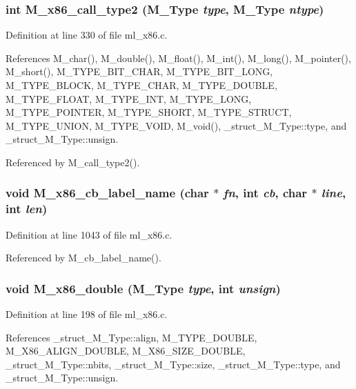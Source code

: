 \subsubsection{\setlength{\rightskip}{0pt plus 5cm}int M\_\-x86\_\-call\_\-type2 (\bf{M\_\-Type} {\em type}, \bf{M\_\-Type} {\em ntype})}\label{ml__x86_8c_a2b8eeed98c4e10d36db0cf9955b7a13}




Definition at line 330 of file ml\_\-x86.c.

References M\_\-char(), M\_\-double(), M\_\-float(), M\_\-int(), M\_\-long(), M\_\-pointer(), M\_\-short(), M\_\-TYPE\_\-BIT\_\-CHAR, M\_\-TYPE\_\-BIT\_\-LONG, M\_\-TYPE\_\-BLOCK, M\_\-TYPE\_\-CHAR, M\_\-TYPE\_\-DOUBLE, M\_\-TYPE\_\-FLOAT, M\_\-TYPE\_\-INT, M\_\-TYPE\_\-LONG, M\_\-TYPE\_\-POINTER, M\_\-TYPE\_\-SHORT, M\_\-TYPE\_\-STRUCT, M\_\-TYPE\_\-UNION, M\_\-TYPE\_\-VOID, M\_\-void(), \_\-struct\_\-M\_\-Type::type, and \_\-struct\_\-M\_\-Type::unsign.

Referenced by M\_\-call\_\-type2().
\subsubsection{\setlength{\rightskip}{0pt plus 5cm}void M\_\-x86\_\-cb\_\-label\_\-name (char $\ast$ {\em fn}, int {\em cb}, char $\ast$ {\em line}, int {\em len})}\label{ml__x86_8c_c47605e04d84eb266b6b962b0e12ad75}




Definition at line 1043 of file ml\_\-x86.c.

Referenced by M\_\-cb\_\-label\_\-name().
\subsubsection{\setlength{\rightskip}{0pt plus 5cm}void M\_\-x86\_\-double (\bf{M\_\-Type} {\em type}, int {\em unsign})}\label{ml__x86_8c_44f6300a10cafc1f87c680770660ea27}




Definition at line 198 of file ml\_\-x86.c.

References \_\-struct\_\-M\_\-Type::align, M\_\-TYPE\_\-DOUBLE, M\_\-X86\_\-ALIGN\_\-DOUBLE, M\_\-X86\_\-SIZE\_\-DOUBLE, \_\-struct\_\-M\_\-Type::nbits, \_\-struct\_\-M\_\-Type::size, \_\-struct\_\-M\_\-Type::type, and \_\-struct\_\-M\_\-Type::unsign.

